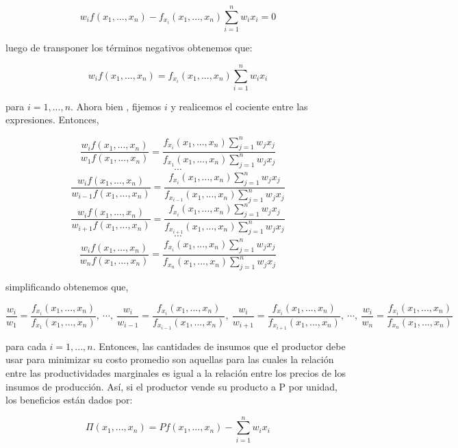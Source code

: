 \[ w_{i}f(x_{1}, ..., x_{n}) - f_{x_{i}}(x_{1}, ..., x_{n}) \sum_{i=1}^{n} w_{i}x_{i} = 0 \]

luego de transponer los términos negativos obtenemos que: 

\[ w_{i}f(x_{1}, ..., x_{n}) = f_{x_{i}}(x_{1}, ..., x_{n}) \sum_{i=1}^{n} w_{i}x_{i} \]

para $i = 1, ..., n$. Ahora bien , fijemos $i$ y realicemos el cociente entre las expresiones. Entonces, 

\[ \frac{w_{i}f(x_{1}, ..., x_{n})}{w_{1}f(x_{1}, ..., x_{n})} = \frac{f_{x_{i}}(x_{1}, ..., x_{n}) \sum_{j=1}^{n} w_{j}x_{j}}{f_{x_{1}}(x_{1}, ..., x_{n}) \sum_{j=1}^{n} w_{j}x_{j}}\]
\[\cdots\]
\[ \frac{w_{i}f(x_{1}, ..., x_{n})}{w_{i-1}f(x_{1}, ..., x_{n})} = \frac{f_{x_{i}}(x_{1}, ..., x_{n}) \sum_{j=1}^{n} w_{j}x_{j}}{f_{x_{i-1}}(x_{1}, ..., x_{n}) \sum_{j=1}^{n} w_{j}x_{j}}\]
\[ \frac{w_{i}f(x_{1}, ..., x_{n})}{w_{i+1}f(x_{1}, ..., x_{n})} = \frac{f_{x_{i}}(x_{1}, ..., x_{n}) \sum_{j=1}^{n} w_{j}x_{j}}{f_{x_{i+1}}(x_{1}, ..., x_{n}) \sum_{j=1}^{n} w_{j}x_{j}}\]
\[\cdots\]
\[ \frac{w_{i}f(x_{1}, ..., x_{n})}{w_{n}f(x_{1}, ..., x_{n})} = \frac{f_{x_{i}}(x_{1}, ..., x_{n}) \sum_{j=1}^{n} w_{j}x_{j}}{f_{x_{n}}(x_{1}, ..., x_{n}) \sum_{j=1}^{n} w_{j}x_{j}}\]

simplificando obtenemos que,

\[\frac{w_{i}}{w_{1}} = \frac{f_{x_{i}}(x_{1}, ..., x_{n})}{f_{x_{1}}(x_{1}, ..., x_{n})}, \ \cdots, \ \frac{w_{i}}{w_{i-1}} = \frac{f_{x_{i}}(x_{1}, ..., x_{n})}{f_{x_{i-1}}(x_{1}, ..., x_{n})}, \ \frac{w_{i}}{w_{i+1}} = \frac{f_{x_{i}}(x_{1}, ..., x_{n})}{f_{x_{i+1}}(x_{1}, ..., x_{n})}, \ \cdots, \ \frac{w_{i}}{w_{n}} = \frac{f_{x_{i}}(x_{1}, ..., x_{n})}{f_{x_{n}}(x_{1}, ..., x_{n})}\]

para cada $i = 1, ..., n$. Entonces, las cantidades de insumos que el productor debe usar para minimizar su costo promedio son aquellas para las cuales la relación entre las productividades marginales es igual a la relación entre los precios de los insumos de producción. Así, si el productor vende su producto a P por unidad, los beneficios están dados por:

\[ \Pi(x_{1}, ..., x_{n}) = Pf(x_{1}, ..., x_{n}) - \sum_{i=1}^{n} w_{i}x_{i} \]
